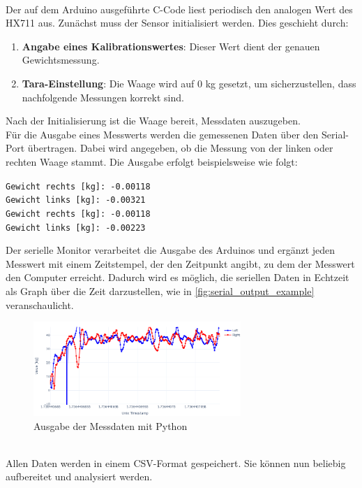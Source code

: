 \\
Der auf dem Arduino ausgeführte C-Code liest periodisch den analogen Wert des HX711 aus. Zunächst muss der Sensor initialisiert werden. Dies geschieht durch:
\begin{enumerate}
    \item \textbf{Angabe eines Kalibrationswertes}: Dieser Wert dient der genauen Gewichtsmessung.
    \item \textbf{Tara-Einstellung}: Die Waage wird auf 0 kg gesetzt, um sicherzustellen, dass nachfolgende Messungen korrekt sind.
\end{enumerate}
Nach der Initialisierung ist die Waage bereit, Messdaten auszugeben.
\\
Für die Ausgabe eines Messwerts werden die gemessenen Daten über den Serial-Port übertragen.
Dabei wird angegeben, ob die Messung von der linken oder rechten Waage stammt.
Die Ausgabe erfolgt beispielsweise wie folgt:
\begin{center}
    \texttt{Gewicht rechts [kg]: -0.00118}  \\
    \texttt{Gewicht links [kg]: -0.00321} \\
    \texttt{Gewicht rechts [kg]: -0.00118} \\
    \texttt{Gewicht links [kg]: -0.00223} \\
\end{center}
Der serielle Monitor verarbeitet die Ausgabe des Arduinos und ergänzt jeden Messwert mit einem Zeitstempel, der den Zeitpunkt angibt, zu dem der Messwert den Computer erreicht. Dadurch wird es möglich, die seriellen Daten in Echtzeit als Graph über die Zeit darzustellen, wie in \autoref{fig:serial_output_example} veranschaulicht.
\begin{figure}[h!]
    \centering
    \includegraphics[width=0.7\textwidth]{img/serial_output_example.png} %
    \caption{Ausgabe der Messdaten mit Python}
    \label{fig:serial_output_example}
\end{figure}
\\
Allen Daten werden in einem CSV-Format gespeichert.
Sie können nun beliebig aufbereitet und analysiert werden.
